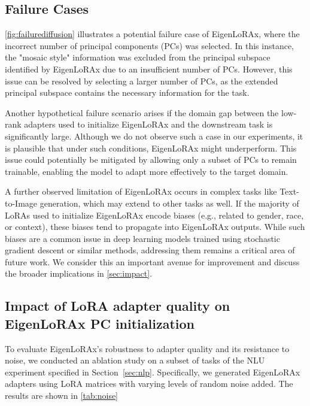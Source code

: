\subsection{Failure Cases}
\label{ssec:failure_append}
\autoref{fig:failurediffusion} illustrates a potential failure case of EigenLoRAx, where the incorrect number of principal components (PCs) was selected. In this instance, the "mosaic style" information was excluded from the principal subspace identified by EigenLoRAx due to an insufficient number of PCs. However, this issue can be resolved by selecting a larger number of PCs, as the extended principal subspace contains the necessary information for the task.

Another hypothetical failure scenario arises if the domain gap between the low-rank adapters used to initialize EigenLoRAx and the downstream task is significantly large. Although we do not observe such a case in our experiments, it is plausible that under such conditions, EigenLoRAx might underperform. This issue could potentially be mitigated by allowing only a subset of PCs to remain trainable, enabling the model to adapt more effectively to the target domain.

A further observed limitation of EigenLoRAx occurs in complex tasks like Text-to-Image generation, which may extend to other tasks as well. If the majority of LoRAs used to initialize EigenLoRAx encode biases (e.g., related to gender, race, or context), these biases tend to propagate into EigenLoRAx outputs. While such biases are a common issue in deep learning models trained using stochastic gradient descent or similar methods, addressing them remains a critical area of future work. We consider this an important avenue for improvement and discuss the broader implications in \cref{sec:impact}.

\subsection{Impact of LoRA adapter quality on EigenLoRAx PC initialization}

To evaluate EigenLoRAx’s robustness to adapter quality and its resistance to noise, we conducted an ablation study on a subset of tasks of the NLU experiment specified in Section~\ref{sec:nlp}. Specifically, we generated EigenLoRAx adapters using LoRA matrices with varying levels of random noise added. The results are shown in \autoref{tab:noise}

